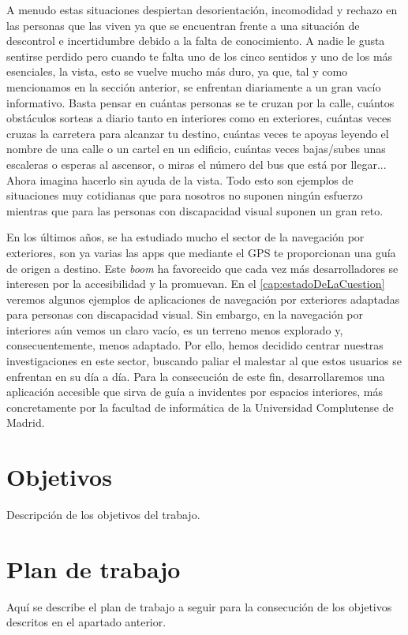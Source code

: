 A menudo estas situaciones despiertan desorientación, incomodidad y rechazo en las personas que las viven ya que se encuentran frente a una situación de descontrol e incertidumbre debido a la falta de conocimiento. A nadie le gusta sentirse perdido pero cuando te falta uno de los cinco sentidos y uno de los más esenciales, la vista, esto se vuelve mucho más duro, ya que, tal y como mencionamos en la sección anterior, se enfrentan diariamente a un gran vacío informativo. Basta pensar en cuántas personas se te cruzan por la calle, cuántos obstáculos sorteas a diario tanto en interiores como en exteriores, cuántas veces cruzas la carretera para alcanzar tu destino, cuántas veces te apoyas leyendo el nombre de una calle o un cartel en un edificio, cuántas veces bajas/subes unas escaleras o esperas al ascensor, o miras el número del bus que está por llegar... Ahora imagina hacerlo sin ayuda de la vista. Todo esto son ejemplos de situaciones muy cotidianas que para nosotros no suponen ningún esfuerzo mientras que para las personas con discapacidad visual suponen un gran reto. 

En los últimos años, se ha estudiado mucho el sector de la navegación por exteriores, son ya varias las apps que mediante el GPS te proporcionan una guía de origen a destino. Este \textit{boom} ha favorecido que cada vez más desarrolladores se interesen por la accesibilidad y la promuevan. En el \autoref{cap:estadoDeLaCuestion} veremos algunos ejemplos de aplicaciones de navegación por exteriores adaptadas para personas con discapacidad visual. Sin embargo, en la navegación por interiores aún vemos un claro vacío, es un terreno menos explorado y, consecuentemente, menos adaptado. Por ello, hemos decidido centrar nuestras investigaciones en este sector, buscando paliar el malestar al que estos usuarios se enfrentan en su día a día. Para la consecución de este fin, desarrollaremos una aplicación accesible que sirva de guía a invidentes por espacios interiores, más concretamente por la facultad de informática de la Universidad Complutense de Madrid.




\section{Objetivos}

Descripción de los objetivos del trabajo.


\section{Plan de trabajo}
Aquí se describe el plan de trabajo a seguir para la consecución de los objetivos descritos en el apartado anterior.



